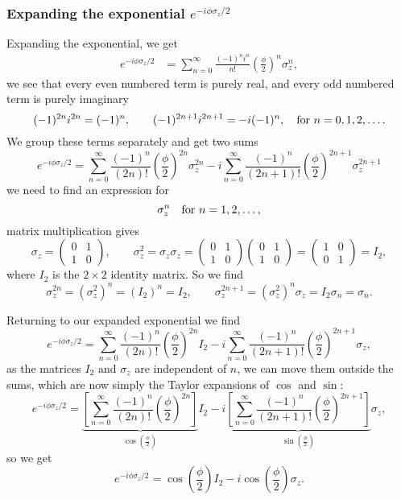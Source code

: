 \documentclass[a4paper, 11pt, titlepage, english]{article}
\begin{document}
\subsubsection*{Expanding the exponential $e^{-i\phi\sigma_z/2}$}
Expanding the exponential, we get
\begin{align*}
e^{-i\phi\sigma_z/2} &= \sum_{n=0}^\infty \frac{(-1)^n i^n}{n!}\left(\frac{\phi}{2}\right)^n\sigma_z^n,
\end{align*}
we see that every even numbered term is purely real, and every odd numbered term is purely imaginary
$$(-1)^{2n}i^{2n} = (-1)^n, \qquad (-1)^{2n+1}i^{2n+1} = -i(-1)^n, \quad {\rm for\ } n=0,1,2,\ldots.$$
We group these terms separately and get two sums
$$e^{-i\phi\sigma_z/2} = \sum_{n=0}^\infty \frac{(-1)^{n}}{(2n)!}\left(\frac{\phi}{2}\right)^{2n}\sigma_z^{2n} - i\sum_{n=0}^\infty \frac{(-1)^{n}}{(2n+1)!}\left(\frac{\phi}{2}\right)^{2n+1}\sigma_z^{2n+1}$$
we need to find an expression for
$$\sigma_z^n \quad {\rm for\ } n=1,2,\ldots,$$
matrix multiplication gives
$$\sigma_z = \begin{pmatrix}
0 & 1 \\ 1 & 0
\end{pmatrix}, \qquad \sigma_z^2 = \sigma_z\sigma_z = \begin{pmatrix}
0 & 1 \\ 1 & 0
\end{pmatrix}\begin{pmatrix}
0 & 1 \\ 1 & 0
\end{pmatrix} = \begin{pmatrix}
1 & 0 \\ 0 & 1
\end{pmatrix} = I_2, $$
where $I_2$ is the $2\times2$ identity matrix. So we find
$$\sigma_z^{2n} = (\sigma_z^2)^n = \left(I_2\right)^n = I_2, \qquad \sigma_z^{2n+1} = (\sigma_z^2)^n \sigma_z = I_2 \sigma_n = \sigma_n.$$

Returning to our expanded exponential we find
$$e^{-i\phi\sigma_z/2} = \sum_{n=0}^\infty \frac{(-1)^{n}}{(2n)!}\left(\frac{\phi}{2}\right)^{2n}I_2 - i\sum_{n=0}^\infty \frac{(-1)^{n}}{(2n+1)!}\left(\frac{\phi}{2}\right)^{2n+1}\sigma_z,$$
as the matrices $I_2$ and $\sigma_z$ are independent of $n$, we can move them outside the sums, which are now simply the Taylor expansions of $\cos$ and $\sin$:
$$e^{-i\phi\sigma_z/2} = \underbrace{\left[\sum_{n=0}^\infty \frac{(-1)^{n}}{(2n)!}\left(\frac{\phi}{2}\right)^{2n}\right]}_{\cos\left(\frac{\phi}{2}\right)}I_2 - i\underbrace{\left[\sum_{n=0}^\infty \frac{(-1)^{n}}{(2n+1)!}\left(\frac{\phi}{2}\right)^{2n+1}\right]}_{\sin\left(\frac{\phi}{2}\right)}\sigma_z,$$
so we get
$$e^{-i\phi\sigma_z/2} = \cos\left(\frac{\phi}{2}\right)I_2 - i\cos\left(\frac{\phi}{2}\right)\sigma_z.$$ \\
\end{document}
